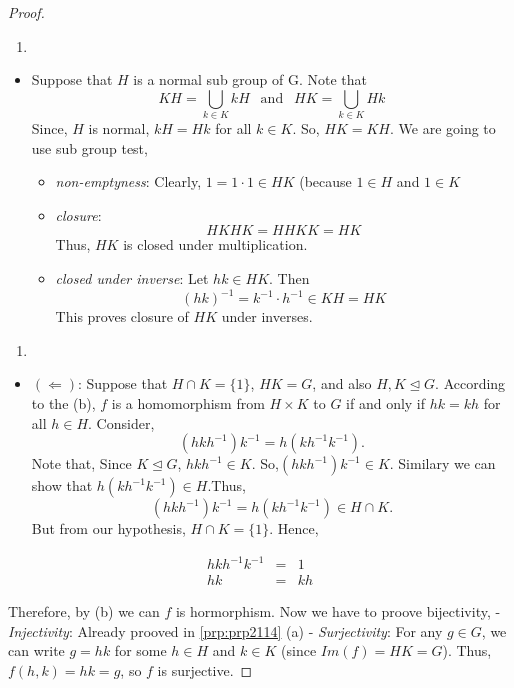 \documentclass[
]{book}
\providecommand{\tightlist}{%
  \setlength{\itemsep}{0pt}\setlength{\parskip}{0pt}}
\theoremstyle{definition}
\theoremstyle{definition}
\theoremstyle{definition}
\theoremstyle{definition}
\theoremstyle{remark}
\begin{document}
\begin{proof}
\begin{enumerate}
\def\labelenumi{\alph{enumi}.}
\setcounter{enumi}{2}
\tightlist
\item
\end{enumerate}

\begin{itemize}
\item
  Suppose that \(H\) is a normal sub group of G. Note that \[KH=\bigcup_{k\in K}kH~~\text{   and     } ~~HK=\bigcup_{k\in K}Hk\]
  Since, \(H\) is normal, \(kH=Hk\) for all \(k\in K\). So, \(HK=KH\). We are going to use sub group test,

  \begin{itemize}
  \tightlist
  \item
    \emph{non-emptyness}: Clearly, \(1=1\cdot 1\in HK\) (because \(1\in H\) and \(1\in K\)
  \item
    \emph{closure}:
    \[HKHK=HHKK=HK\]
    Thus, \(HK\) is closed under multiplication.
  \item
    \emph{closed under inverse}: Let \(hk\in HK\). Then
    \[(hk)^{-1} = k^{-1}\cdot h^{-1} \in KH=HK \]
    This proves closure of \(HK\) under inverses.
  \end{itemize}
\end{itemize}

\begin{enumerate}
\def\labelenumi{\alph{enumi}.}
\setcounter{enumi}{3}
\tightlist
\item
\end{enumerate}

\begin{itemize}
\tightlist
\item
  \((\Longleftarrow)\): Suppose that \(H \cap K = \{1\}\), \(HK = G\), and also \(H,K \trianglelefteq G\). According to the (b), \(f\) is a homomorphism from \(H \times K\) to \(G\) if and only if \(hk = kh\) for all \(h\in H\). Consider,
  \[(hkh^{-1})k^{-1}=h(kh^{-1}k^{-1}).\]
  Note that, Since \(K \trianglelefteq G\), \(hkh^{-1}\in K\). So,\((hkh^{-1})k^{-1}\in K\). Similary we can show that \(h(kh^{-1}k^{-1})\in H\).Thus,\[(hkh^{-1})k^{-1}=h(kh^{-1}k^{-1})\in H\cap K.\] But from our hypothesis, \(H\cap K=\{1\}\). Hence,
\end{itemize}

\begin{eqnarray}
hkh^{-1}k^{-1}&=&1\\
hk&=& kh
\end{eqnarray}

Therefore, by (b) we can \(f\) is hormorphism. Now we have to proove bijectivity,
- \emph{Injectivity}: Already prooved in \ref{prp:prp2114} (a)
- \emph{Surjectivity}: For any \(g \in G\), we can write \(g = hk\) for some \(h \in H\) and \(k \in K\) (since \(Im(f)=HK = G\)). Thus, \(f(h, k) = hk = g\), so \(f\) is surjective.


\end{proof}
\end{document}
